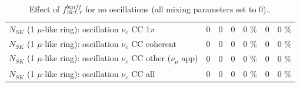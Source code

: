 \begin{table}
\begin{tabular}{| l | r | r | r  r | r  r |}
                     $N_{SK}$ (1 $\mu$-like ring): oscillation $\nu_e$ CC 1$\pi$ &               0 &               0 &               0 &        0 \%  &               0 &        0 \%  \\ 
                   $N_{SK}$ (1 $\mu$-like ring): oscillation $\nu_e$ CC coherent &               0 &               0 &               0 &        0 \%  &               0 &        0 \%  \\ 
      $N_{SK}$ (1 $\mu$-like ring): oscillation $\nu_e$ CC other ($\nu_\mu$ app) &               0 &               0 &               0 &        0 \%  &               0 &        0 \%  \\ 
                       $N_{SK}$ (1 $\mu$-like ring): oscillation $\nu_e$  CC all &               0 &               0 &               0 &        0 \%  &               0 &        0 \%  \\ 
\hline
\hline
\end{tabular}
\caption{ Effect of $f_{16; t, r}^{banff}$ for no oscillations (all mixing parameters set to 0).. }
\label{tab:num_banff_maqe_1RmuT_3f_osc_t13:0}
\end{table}
\clearpage
